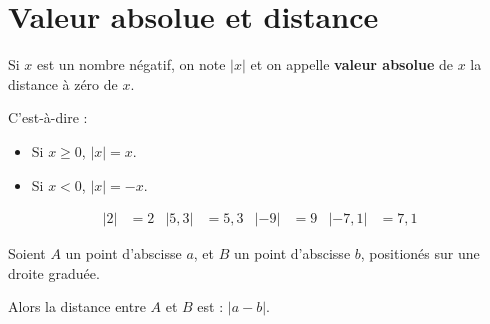\documentclass[
	10pt,
	classe=$2^{de}$,
]{coursclass}
\begin{document}
\section{Valeur absolue et distance}

\begin{definition}
	Si $x$ est un nombre négatif, on note $|x|$ et on appelle \textbf{valeur absolue} de $x$ la distance à zéro de $x$.

	C'est-à-dire :
	\begin{itemize}
		\item Si $x ≥ 0$, $|x| = x$.
		\item Si $x < 0$, $|x| = -x$.
	\end{itemize}
\end{definition}

\begin{exemple}
	\begin{align*}
		|2| & = 2 & |5,3| & = 5,3 & |-9| & = 9 & |-7,1| & = 7,1
	\end{align*}
\end{exemple}

\begin{definition}
	Soient $A$ un point d'abscisse $a$, et $B$ un point d'abscisse $b$, positionés sur une droite graduée.

	Alors la distance entre $A$ et $B$ est : $|a - b|$.
\end{definition}
\end{document}
